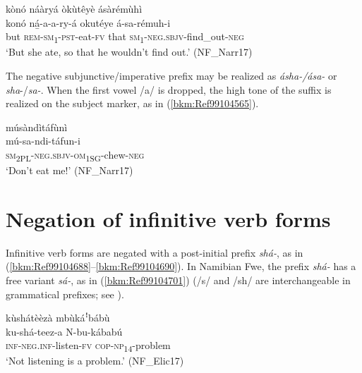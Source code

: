 \ea
\label{bkm:Ref99104547}
kònó náàryá òkùtêyè ásàrémùhì\\
\gll konó  ná̲-a-a-ry-á      okutéye  á-sa-rémuh-i\\
but  \textsc{rem}-\textsc{sm}\textsubscript{1}-\textsc{pst}-eat-\textsc{fv}  that    \textsc{sm}\textsubscript{1}-\textsc{neg}.\textsc{sbjv}-find\_out-\textsc{neg}\\
\glt ‘But she ate, so that he wouldn’t find out.’ (NF\_Narr17)
\z

The negative subjunctive/imperative prefix may be realized as \textit{ásha-/ása-} or \textit{sha}-/\textit{sa-}. When the first vowel /a/ is dropped, the high tone of the suffix is realized on the subject marker, as in (\ref{bkm:Ref99104565}).

\ea
\label{bkm:Ref99104565}
\glll músàndìtáfùnì\\
mú-sa-ndi-táfun-i\\
\textsc{sm}\textsubscript{2PL}-\textsc{neg}.\textsc{sbjv}-\textsc{om}\textsubscript{1SG}-chew-\textsc{neg}\\
\glt ‘Don’t eat me!’ (NF\_Narr17)
\z
\section{Negation of infinitive verb forms}
\hypertarget{Toc75352709}{}
Infinitive verb forms are negated with a post-initial prefix \textit{shá-}, as in (\ref{bkm:Ref99104688}--\ref{bkm:Ref99104690}). In Namibian Fwe, the prefix \textit{shá-} has a free variant \textit{sá-}, as in (\ref{bkm:Ref99104701}) (/s/ and /sh/ are interchangeable in grammatical prefixes; see ).

\ea
\label{bkm:Ref99104688}
kùshátèèzà mbùkáꜝbábù\\
\gll ku-shá-teez-a    N-bu-kábabú\\
\textsc{inf}-\textsc{neg}.\textsc{inf}-listen-\textsc{fv}  \textsc{cop}-\textsc{np}\textsubscript{14}-problem\\
\glt ‘Not listening is a problem.’ (NF\_Elic17)
\z

